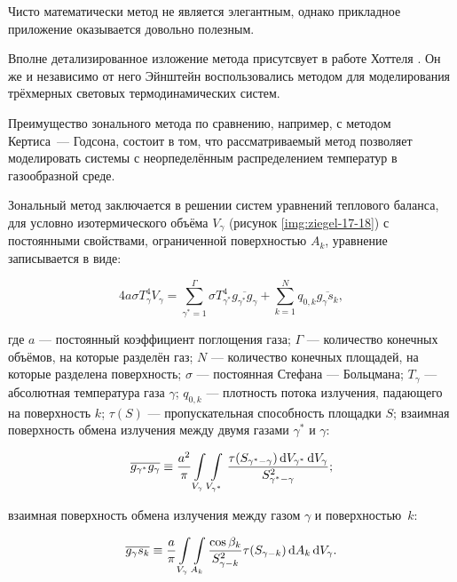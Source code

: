 Чисто математически метод не является элегантным, однако прикладное приложение оказывается довольно полезным.

Вполне детализированное изложение метода присутсвует в работе Хоттеля \cite{hottel-1}.
Он же \cite{hottel-2} и независимо от него Эйнштейн \cite{einstein-1, einstein-2} воспользовались методом для моделирования трёхмерных световых термодинамических систем.

Преимущество зонального метода по сравнению, например, с методом Кертиса~— Годсона, состоит в том, что рассматриваемый метод позволяет моделировать системы с неорпеделённым распределением температур в газообразной среде.


Зональный метод заключается в решении систем уравнений теплового баланса, для условно изотермического объёма $V_\gamma$ (рисунок \ref{img:ziegel-17-18}) с постоянными свойствами, ограниченной поверхностью $A_k$, уравнение записывается в виде:

\begin{equation}
	4a\sigma T^4_\gamma V_\gamma = \sum_{\gamma^* = 1}^{\Gamma} \sigma T^4_{\gamma^*} \overline{g_{\gamma^*} g_\gamma} + \sum_{k=1}^{N} q_{0, k} \overline{g_\gamma s_k},
\end{equation}

\noindent где $a$ — постоянный коэффициент поглощения газа; $\Gamma$ — количество конечных объёмов, на которые разделён газ; $N$ — количество конечных площадей, на которые разделена поверхность; $\sigma$ — постоянная Стефана — Больцмана; $T_\gamma$ — абсолютная температура газа $\gamma$; $q_{0, k}$ — плотность потока излучения, падающего на поверхность $k$; $\tau(S)$ — пропускательная способность площадки $S$;
взаимная поверхность обмена излучения между двумя газами $\gamma^*$ и $\gamma$:

\begin{equation}
	\overline{g_{\gamma^*} g_\gamma} \equiv \frac{a^2}{\pi} \int\displaylimits_{V_\gamma} \int\displaylimits_{V_{\gamma^*}} \frac{\tau(S_{\gamma^*-\gamma}) \,\mathrm dV_{\gamma^*} \,\mathrm dV_\gamma}{S^2_{\gamma^*-\gamma}};
\end{equation}

\noindent взаимная поверхность обмена излучения между газом $\gamma$ и поверхностью~$k$:

\begin{equation}
	\overline{g_\gamma s_k} \equiv \frac a\pi  \int\displaylimits_{V_\gamma} \int\displaylimits_{A_k} \frac{\cos{\beta_k}}{S^2_{\gamma-k}} \tau (S_{\gamma - k}) \,\mathrm dA_k \, \mathrm dV_\gamma.
\end{equation}

